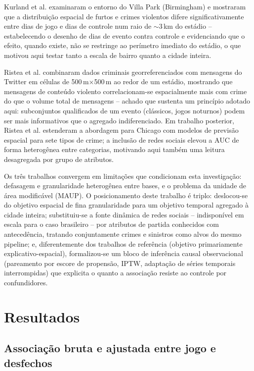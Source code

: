 \documentclass[12pt]{article}
\begin{document}
Kurland et al. \cite{kurland2014} examinaram o entorno do Villa Park
(Birmingham) e mostraram que a distribuição espacial de furtos e crimes
violentos difere significativamente entre dias de jogo e dias de controle
num raio de $\sim$3\,km do estádio -- estabelecendo o desenho de dias de
evento contra controle e evidenciando que o efeito, quando existe, não se
restringe ao perímetro imediato do estádio, o que motivou aqui testar
tanto a escala de bairro quanto a cidade inteira.

Ristea et al. \cite{ristea2018} combinaram dados criminais
georreferenciados com mensagens do Twitter em células de
500\,m$\times$500\,m ao redor de um estádio, mostrando que mensagens de
conteúdo violento correlacionam-se espacialmente mais com crime do que o
volume total de mensagens -- achado que sustenta um princípio adotado
aqui: subconjuntos qualificados de um evento (clássicos, jogos noturnos)
podem ser mais informativos que o agregado indiferenciado. Em trabalho
posterior, Ristea et al. \cite{ristea2020} estenderam a abordagem para
Chicago com modelos de previsão espacial para sete tipos de crime; a
inclusão de redes sociais elevou a AUC de forma heterogênea entre
categorias, motivando aqui também uma leitura desagregada por grupo de
atributos.

Os três trabalhos convergem em limitações que condicionam esta
investigação: defasagem e granularidade heterogênea entre bases, e o
problema da unidade de área modificável (MAUP). O posicionamento deste
trabalho é triplo: deslocou-se do objetivo espacial de fina granularidade
para um objetivo temporal agregado à cidade inteira; substituiu-se a fonte
dinâmica de redes sociais -- indisponível em escala para o caso brasileiro
-- por atributos de partida conhecidos com antecedência, tratando
conjuntamente crimes e sinistros como alvos do mesmo pipeline; e,
diferentemente dos trabalhos de referência (objetivo primariamente
explicativo-espacial), formalizou-se um bloco de inferência causal
observacional (pareamento por escore de propensão, IPTW, adaptação de
séries temporais interrompidas) que explicita o quanto a associação
resiste ao controle por confundidores.



\section{Resultados}

\subsection{Associação bruta e ajustada entre jogo e desfechos}
\end{document}
